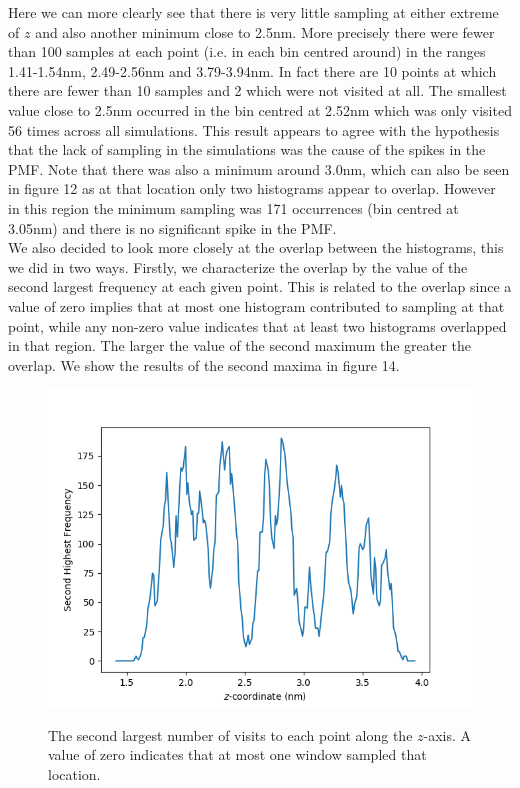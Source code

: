 \documentclass[12pt, onecolumn]{revtex4}    %
\begin{document}
Here we can more clearly see that there is very little sampling at either extreme of $z$ and also another minimum close to 2.5nm. More precisely there were fewer than 100 samples at each point (i.e. in each bin centred around) in the ranges 1.41-1.54nm, 2.49-2.56nm and 3.79-3.94nm.  In fact there are 10 points at which there are fewer than 10 samples and 2 which were not visited at all.  The smallest value close to 2.5nm occurred in the bin centred at 2.52nm which was only visited 56 times across all simulations.  This result appears to agree with the hypothesis that the lack of sampling in the simulations was the cause of the spikes in the PMF.  Note that there was also a minimum around 3.0nm, which can also be seen in figure 12 as at that location only two histograms appear to overlap.  However in this region the minimum sampling was 171 occurrences (bin centred at 3.05nm) and there is no significant spike in the PMF.\\

We also decided to look more closely at the overlap between the histograms, this we did in two ways.  Firstly, we characterize the overlap by the value of the second largest frequency at each given point.  This is related to the overlap since a value of zero implies that at most one histogram contributed to sampling at that point, while any non-zero value indicates that at least two histograms overlapped in that region.  The larger the value of the second maximum the greater the overlap.  We show the results of the second maxima in figure 14.\\  

\begin{figure}[h!]
\includegraphics[scale=0.5]{HelUMBScnd}
\label{fig: HelUmbScnd}
\caption{The second largest number of visits to each point along the $z$-axis.  A value of zero indicates that at most one window sampled that location.}
\end{figure}
\end{document}
